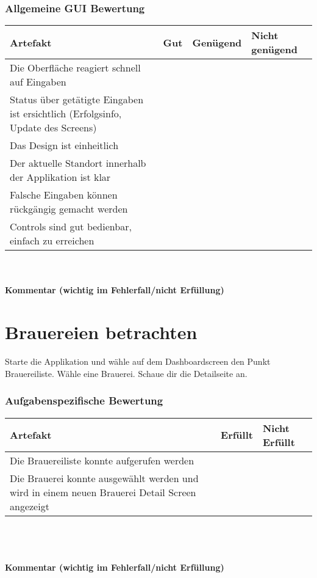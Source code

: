 \documentclass[10pt,a4paper]{scrartcl}
\begin{document}
\subsubsection*{Allgemeine GUI Bewertung}
\begin{tabular}{|p{}|p{}|p{}|p{}|}
\hline 
\rule[-1ex]{0pt}{2.5ex} \textbf{Artefakt} & \textbf{Gut} & \textbf{Genügend} & \textbf{Nicht genügend} \\ 
\hline 
\rule[-1ex]{0pt}{2.5ex} Die Oberfläche reagiert schnell auf Eingaben &  &  &  \\ 
\hline 
\rule[-1ex]{0pt}{2.5ex} Status über getätigte Eingaben ist ersichtlich (Erfolgsinfo, Update des Screens) &  &  &  \\ 
\hline 
\rule[-1ex]{0pt}{2.5ex} Das Design ist einheitlich &  &  &  \\ 
\hline 
\rule[-1ex]{0pt}{2.5ex} Der aktuelle Standort innerhalb der Applikation ist klar &  &  &  \\ 
\hline 
\rule[-1ex]{0pt}{2.5ex} Falsche Eingaben können rückgängig gemacht werden &  &  &  \\ 
\hline 
\rule[-1ex]{0pt}{2.5ex} Controls sind gut bedienbar, einfach zu erreichen &  &  &  \\  
\hline 
\end{tabular} 
\\
\\
\textbf{Kommentar (wichtig im Fehlerfall/nicht Erfüllung)}
\vspace*{4cm}


\section{Brauereien betrachten}
Starte die Applikation und wähle auf dem Dashboardscreen den Punkt Brauereiliste. Wähle eine
Brauerei. Schaue dir die Detailseite an.

\subsubsection*{Aufgabenspezifische Bewertung}
\begin{tabular}{|p{}|p{}|p{}|}
\hline 
\textbf{Artefakt} & \textbf{Erfüllt} & \textbf{Nicht Erfüllt} \\ 
\hline 
Die Brauereiliste konnte aufgerufen werden &  &  \\ 
\hline 
Die Brauerei konnte ausgewählt werden und wird in einem neuen Brauerei Detail Screen angezeigt &  &  \\ 
\hline 
\end{tabular}
\\
\\
\\
\textbf{Kommentar (wichtig im Fehlerfall/nicht Erfüllung)}
\vspace*{4cm}
\end{document}
